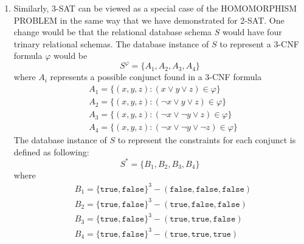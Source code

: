 \begin{enumerate}
    \item Similarly, 3-SAT can be viewed as a special case of the HOMOMORPHISM PROBLEM in the same 
    way that we have demonstrated for 2-SAT. One change would be that the relational database schema  
    $S$ would have four trinary relational schemas. The database instance of $S$ to represent a 3-CNF 
    formula $\varphi$ would be
    \begin{equation*}
        S^{\varphi} = \{A_1, A_2, A_3, A_4\}
    \end{equation*}
    where $A_i$ represents a possible conjunct found in a 3-CNF formula
    \begin{align*}
        & A_1 = \{(x,y,z) : (x \lor y \lor z) \in \varphi\} \\
        & A_2 = \{(x,y,z) : (\neg x \lor y \lor z) \in \varphi\} \\
        & A_3 = \{(x,y,z) : (\neg x \lor \neg y \lor z) \in \varphi \} \\
        & A_4 = \{(x,y,z) : (\neg x \lor \neg y \lor \neg z) \in \varphi \}
    \end{align*} 
    The database instance of $S$ to represent the constraints for each conjunct is defined as following:
    \begin{equation*}
        S^* = \{B_1, B_2, B_3, B_4\}
    \end{equation*}
    where 
    \begin{align*}
        & B_1 = \{\texttt{true}, \texttt{false}\}^3 - {(\texttt{false}, \texttt{false}, \texttt{false})} \\
        & B_2 = \{\texttt{true}, \texttt{false}\}^3 - {(\texttt{true}, \texttt{false}, \texttt{false})} \\
        & B_3 = \{\texttt{true}, \texttt{false}\}^3 - {(\texttt{true}, \texttt{true}, \texttt{false})} \\
        & B_4 = \{\texttt{true}, \texttt{false}\}^3 - {(\texttt{true}, \texttt{true}, \texttt{true})} \\
    \end{align*}
\end{enumerate}
